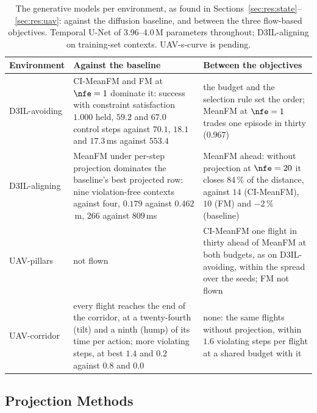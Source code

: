 \begin{table}[htpb]
  \caption[Generative models across environments]{The generative models per environment, as found in
  Sections~\ref{sec:res:state}--\ref{sec:res:uav}: against the diffusion baseline, and between the three
  flow-based objectives. Temporal U-Net of 3.96--4.0\,M parameters throughout; D3IL-aligning on
  training-set contexts. UAV-s-curve is pending.}
  \label{tab:summary-models}
  \centering
  \small
  \begin{tabularx}{\linewidth}{@{}p{2.2cm} L L@{}}
    \toprule
    Environment & Against the baseline & Between the objectives \\
    \midrule
    D3IL-avoiding & CI-MeanFM and FM at $\nfe=1$ dominate it: success with constraint satisfaction $1.000$ held,
                    $59.2$ and $67.0$ control steps against $70.1$, $18.1$ and $17.3$\,ms against $553.4$
                  & the budget and the selection rule set the order; MeanFM at $\nfe=1$ trades one episode in
                    thirty ($0.967$) \\
    D3IL-aligning & MeanFM under per-step projection dominates the baseline's best projected row: nine
                    violation-free contexts against four, $0.179$ against $0.462$\,m, $266$ against $809$\,ms
                  & MeanFM ahead: without projection at $\nfe=20$ it closes $84\,\%$ of the distance, against
                    $14$ (CI-MeanFM), $10$ (FM) and $-2\,\%$ (baseline) \\
    UAV-pillars   & not flown
                  & CI-MeanFM one flight in thirty ahead of MeanFM at both budgets, as on D3IL-avoiding, within
                    the spread over the seeds; FM not flown \\
    UAV-corridor  & every flight reaches the end of the corridor, at a twenty-fourth (tilt) and a ninth (hump)
                    of its time per action; more violating steps, at best $1.4$ and $0.2$ against $0.8$ and $0.0$
                  & none: the same flights without projection, within $1.6$ violating steps per flight at a
                    shared budget with it \\
    \bottomrule
  \end{tabularx}
\end{table}

\subsection{Projection Methods}\label{sec:res:constraints}

